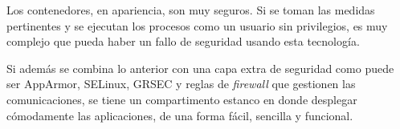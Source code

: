 Los contenedores, en apariencia, son muy seguros. Si se toman las medidas 
pertinentes y se ejecutan los procesos como un usuario sin privilegios, es
muy complejo que pueda haber un fallo de seguridad usando esta tecnología.

Si además se combina lo anterior con una capa extra de seguridad como puede
ser AppArmor, SELinux, GRSEC y reglas de \textit{firewall} que gestionen las
comunicaciones, se tiene un compartimento estanco en donde desplegar
cómodamente las aplicaciones, de una forma fácil, sencilla y funcional.